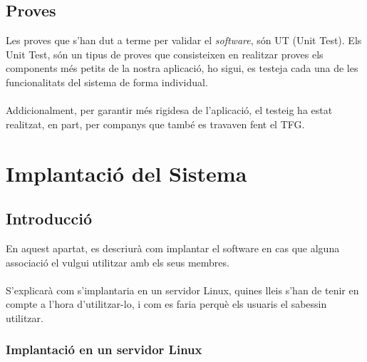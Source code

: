 \documentclass[11pt,catalan,listoffigures,listoftables]{tfgetsinf}
\begin{document}
\section{Proves}
Les proves que s'han dut a terme per validar el \textit{software}, són UT (Unit Test). Els Unit Test, són un tipus de proves que consisteixen en realitzar proves els components més petits de la nostra aplicació, ho sigui, es testeja cada una de les funcionalitats del sistema de forma individual.\\ \\
Addicionalment, per garantir més rigidesa de l'aplicació, el testeig ha estat realitzat, en part, per companys que també es travaven fent el TFG.
\chapter{Implantació del Sistema}
\section{Introducció}
En aquest apartat, es descriurà com implantar el software en cas que alguna associació el vulgui utilitzar amb els seus membres.\\ \\
S'explicarà com s'implantaria en un servidor Linux, quines lleis s'han de tenir en compte a l'hora d'utilitzar-lo, i com es faria perquè els usuaris el sabessin utilitzar.

\subsection{Implantació en un servidor Linux}
\end{document}
